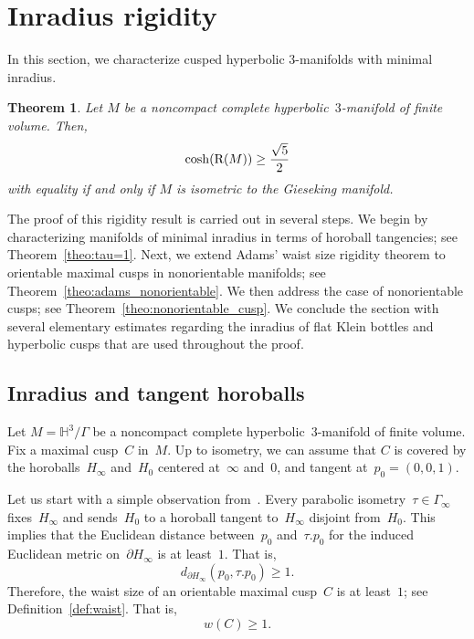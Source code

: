 \documentclass[11pt,reqno]{amsart}
\newtheorem{theorem}{Theorem}[section]
\theoremstyle{definition}
\numberwithin{equation}{section}
\newcommand{\HH}{{\mathbb H}}
\newcommand\RR{{\rm R}}
\numberwithin{equation}{section}
\begin{document}
\section{Inradius rigidity}

In this section, we characterize cusped hyperbolic $3$-manifolds with minimal inradius.

\begin{theorem} \label{theo:rigidity}
Let $M$ be a noncompact complete hyperbolic~$3$-manifold of finite volume.
Then,
\begin{equation*} \label{eq:rigidity}
\cosh(\RR(M))  \geq \frac{\sqrt{5}}{2}
\end{equation*}
with equality if and only if $M$ is isometric to the Gieseking manifold.
\end{theorem}

The proof of this rigidity result is carried out in several steps.
We begin by characterizing manifolds of minimal inradius in terms of horoball tangencies; see Theorem~\ref{theo:tau=1}.
Next, we extend Adams' waist size rigidity theorem to orientable maximal cusps in nonorientable manifolds; see Theorem~\ref{theo:adams_nonorientable}.
We then address the case of nonorientable cusps; see Theorem~\ref{theo:nonorientable_cusp}.
We conclude the section with several elementary estimates regarding the inradius of flat Klein bottles and hyperbolic cusps that are used throughout the proof.

\subsection{Inradius and tangent horoballs}

Let $M = \HH^3 / \Gamma$ be a noncompact complete hyperbolic~$3$-manifold of finite volume.
Fix a maximal cusp~$C$ in~$M$.
Up to isometry, we can assume that $C$ is covered by the horoballs~$H_\infty$ and~$H_0$ centered at~$\infty$ and~$0$, and tangent at~$p_0=(0,0,1)$.

\medskip

Let us start with a simple observation from~\cite[Lemma~2.3]{adams_waist}.
Every parabolic isometry~$\tau \in \Gamma_\infty$ fixes~$H_\infty$ and sends~$H_0$ to a horoball tangent to~$H_\infty$ disjoint from~$H_0$.
This implies that the Euclidean distance between~$p_0$ and~$\tau.p_0$ for the induced Euclidean metric on~$\partial H_\infty$ is at least~$1$. 
That is,
\begin{equation} \label{eq:tau>1}
d_{\partial H_\infty}(p_0,\tau.p_0) \geq 1.
\end{equation}
Therefore, the waist size of an orientable maximal cusp~$C$ is at least~$1$; see Definition~\ref{def:waist}.
That is,
\begin{equation} \label{eq:wC>1}
w(C) \geq 1.
\end{equation}
\end{document}
